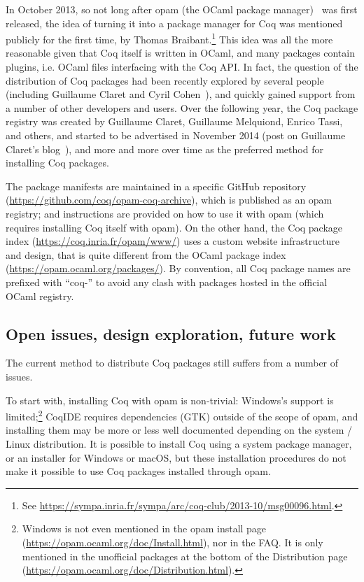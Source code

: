 In October 2013, so not long after opam (the OCaml package manager)~\cite{opam2013} was first released, the idea of turning it into a package manager for Coq was mentioned publicly for the first time, by Thomas Braibant.\footnote{
	See \url{https://sympa.inria.fr/sympa/arc/coq-club/2013-10/msg00096.html}.
}
This idea was all the more reasonable given that Coq itself is written in OCaml, and many packages contain plugins, i.e. OCaml files interfacing with the Coq API.
In fact, the question of the distribution of Coq packages had been recently explored by several people (including Guillaume Claret and Cyril Cohen~\cite{claret2015opam}), and quickly gained support from a number of other developers and users.
Over the following year, the Coq package registry was created by Guillaume Claret, Guillaume Melquiond, Enrico Tassi, and others, and started to be advertised in November 2014 (post on Guillaume Claret's blog~\cite{claret2014opam}), and more and more over time as the preferred method for installing Coq packages.

The package manifests are maintained in a specific GitHub repository (\url{https://github.com/coq/opam-coq-archive}), which is published as an opam registry; and instructions are provided on how to use it with opam (which requires installing Coq itself with opam).
On the other hand, the Coq package index (\url{https://coq.inria.fr/opam/www/}) uses a custom website infrastructure and design, that is quite different from the OCaml package index (\url{https://opam.ocaml.org/packages/}).
By convention, all Coq package names are prefixed with ``coq-'' to avoid any clash with packages hosted in the official OCaml registry.

\subsection{Open issues, design exploration, future work}

\label{sec:open-issues-distribution}

The current method to distribute Coq packages still suffers from a number of issues.

To start with, installing Coq with opam is non-trivial: Windows's support is limited;\footnote{
	Windows is not even mentioned in the opam install page (\url{https://opam.ocaml.org/doc/Install.html}), nor in the FAQ.
	It is only mentioned in the unofficial packages at the bottom of the Distribution page (\url{https://opam.ocaml.org/doc/Distribution.html}).
}
CoqIDE requires dependencies (GTK) outside of the scope of opam, and installing them may be more or less well documented depending on the system / Linux distribution.
It is possible to install Coq using a system package manager, or an installer for Windows or macOS, but these installation procedures do not make it possible to use Coq packages installed through opam.

